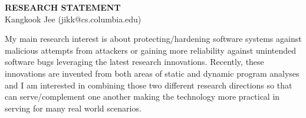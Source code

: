 \documentclass[letterpaper, 10pt]{article}
\begin{document}
\thispagestyle{fancy}

\lhead{}
\rhead{}

\renewcommand{\headrulewidth}{0pt} \renewcommand{\footrulewidth}{0pt}
\fancyfoot[C]{\footnotesize
  \textcolor{gray}{http://www.cs.columbia.edu/$\sim$jikk/application}}

\pagestyle{fancy}
\lhead{\textcolor{gray}{\it Kangkook Jee}}
\rhead{\textcolor{gray}{\thepage /\pageref{LastPage}}}

\begin{small}

\begin{center}
{\LARGE \bf RESEARCH STATEMENT}\\
\vspace*{0.1cm}
{\normalsize Kangkook Jee (jikk@cs.columbia.edu)}
\end{center}



My main research interest is about protecting/hardening software systems against
malicious attempts from attackers or gaining more reliability against unintended
software bugs leveraging the latest research innovations. Recently, these
innovations are invented from both areas of static and dynamic program analyses
and I am interested in combining those two different research directions so that
can serve/complement one another making the technology more practical in serving
for many real world scenarios.


\end{small}
\end{document}
